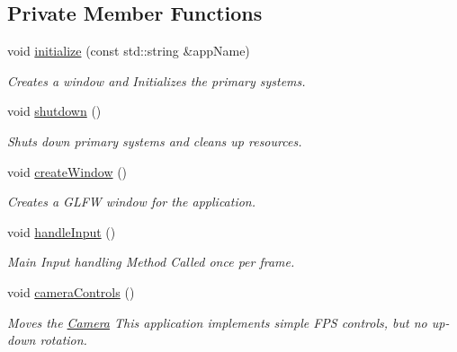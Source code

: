 \subsection*{Private Member Functions}
\begin{DoxyCompactItemize}
\item 
void \mbox{\hyperlink{class_vk_app_af9b4dc5cc727da69f79669d47a514c5a}{initialize}} (const std\+::string \&app\+Name)
\begin{DoxyCompactList}\small\item\em Creates a window and Initializes the primary systems. \end{DoxyCompactList}\item 
\mbox{\label{class_vk_app_aca6045f8d93aeeae6a1ba8cbc5f95fbc}} 
void \mbox{\hyperlink{class_vk_app_aca6045f8d93aeeae6a1ba8cbc5f95fbc}{shutdown}} ()
\begin{DoxyCompactList}\small\item\em Shuts down primary systems and cleans up resources. \end{DoxyCompactList}\item 
\mbox{\label{class_vk_app_a6ad700df19a47f87b4adfa6dde09ef49}} 
void \mbox{\hyperlink{class_vk_app_a6ad700df19a47f87b4adfa6dde09ef49}{create\+Window}} ()
\begin{DoxyCompactList}\small\item\em Creates a G\+L\+FW window for the application. \end{DoxyCompactList}\item 
\mbox{\label{class_vk_app_a7ec8d8898e545cb1fd3b7ff1495b1221}} 
void \mbox{\hyperlink{class_vk_app_a7ec8d8898e545cb1fd3b7ff1495b1221}{handle\+Input}} ()
\begin{DoxyCompactList}\small\item\em Main Input handling Method Called once per frame. \end{DoxyCompactList}\item 
\mbox{\label{class_vk_app_a38a29f1dda4fb55f7460cce2cbc0adf9}} 
void \mbox{\hyperlink{class_vk_app_a38a29f1dda4fb55f7460cce2cbc0adf9}{camera\+Controls}} ()
\begin{DoxyCompactList}\small\item\em Moves the \mbox{\hyperlink{class_camera}{Camera}} This application implements simple F\+PS controls, but no up-\/down rotation. \end{DoxyCompactList}\item 

\end{DoxyCompactItemize}
